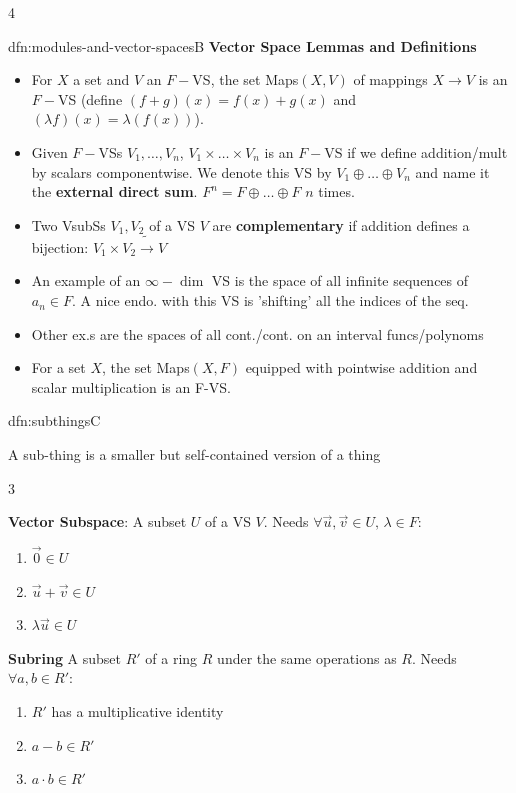 \documentclass[landscape, 8pt]{extarticle}
\begin{document}
\begin{multicols*}{4}
\begin{mdfn}{dfn:modules-and-vector-spaces}{B}
			\textbf{Vector Space Lemmas and Definitions}
			\begin{itemize}
				\item For $X$ a set and $V$ an $F-$VS, the set Maps$(X, V)$ of mappings $X \to V$ is an $F-$VS (define $(f+g)(x) = f(x) + g(x)$ and $(\lambda f)(x) = \lambda (f(x))$).
				\item Given $F-$VSs $V_1, \dots, V_n$, $V_1 \times \dots \times V_n$ is an $F-$VS if we define addition/mult by scalars componentwise. We denote this VS by $V_1 \oplus \dots \oplus V_n$ and name it the \textbf{external direct sum}. $F^n = F \oplus \dots \oplus F$ $n$ times.
				\item Two VsubSs $V_1, V_2$ of a VS $V$ are \textbf{complementary} if addition defines a bijection: $V_1 \times V_2 \tilde{\to} V$
				\item An example of an $\infty-\dim$ VS is the space of all infinite sequences of $a_n\in F$. A nice endo. with this VS is 'shifting' all the indices of the seq.\\
				\item Other ex.s are the spaces of all cont./cont. on an interval funcs/polynoms
				\item For a set $X$, the set Maps$(X, F)$ equipped with pointwise addition and scalar multiplication is an F-VS. 
			\end{itemize}
		\end{mdfn}
		
		
		\begin{mdfn}{dfn:subthings}{C}
			
			A sub-thing is a smaller but self-contained version of a thing
		{
			\setlength{\columnseprule}{0.5pt}
			\begin{multicols}{3}
				
				\vspace*{-6ex}
				
				\textbf{Vector Subspace}: A subset $U$ of a VS $V$. Needs $\forall\vec{u}, \vec{v}\in U,\,\lambda\in F$:
				\begin{enumerate}
					\item $\vec{0}\in U$
					\item $\vec{u} + \vec{v} \in U$
					\item $\lambda \vec{u}\in U$
				\end{enumerate}
				\columnbreak    
				
				\vspace*{-7ex}
				
				\textbf{Subring} A subset $R'$ of a ring $R$ under the same operations as $R$. Needs $\forall a, b\in R'$:
				\begin{enumerate}
					\item $R'$ has a multiplicative identity
					\item $a - b \in R'$
					\item $a \cdot b\in R'$
				\end{enumerate}
				

\end{multicols}}
\end{mdfn}
\end{multicols*}
\end{document}
